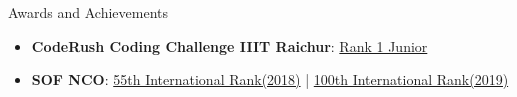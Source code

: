 \documentclass{resume} %
\begin{document}
\begin{rSection}{Awards and Achievements}

   \begin{itemize}
      \itemsep -3pt {}
      \item \textbf{CodeRush Coding Challenge IIIT Raichur}: \href{https://drive.google.com/file/d/1BdOPAlKCXyNEZf-ujJ5Iu8lBBra77hJg/view?usp=sharing}{Rank 1 Junior}
      \item \textbf{SOF NCO}: \href{https://drive.google.com/file/d/1b_JE3MbNI2eW9xpYvC1NWCfUGChuEVBy/view?usp=sharing}{55th International Rank(2018)} | \href{https://drive.google.com/file/d/1bnRRCB6FZKDpJm0-Ogz15o56iG2QN_1t/view?usp=sharing}{100th International Rank(2019)}
   \end{itemize}

\end{rSection}






\end{document}
